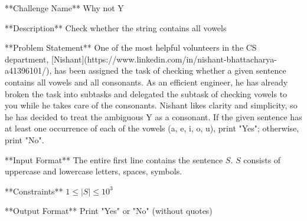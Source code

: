 **Challenge Name**  
Why not Y

**Description**  
Check whether the string contains all vowels

**Problem Statement**  
One of the most helpful volunteers in the CS department, [Nishant](https://www.linkedin.com/in/nishant-bhattacharya-a41396101/), has been assigned the task of checking whether a given sentence contains all vowels and all consonants. As an efficient engineer, he has already broken the task into subtasks and delegated the subtask of checking vowels to you while he takes care of the consonants. Nishant likes clarity and simplicity, so he has decided to treat the ambiguous Y as a consonant. If the given sentence has at least one occurrence of each of the vowels (a, e, i, o, u), print "Yes"; otherwise, print "No".

**Input Format**  
The entire first line contains the sentence $S$.  
$S$ consists of uppercase and lowercase letters, spaces, symbols.

**Constraints**  
$1 \leq |S| \leq 10^3$ 

**Output Format**  
Print "Yes" or "No" (without quotes)